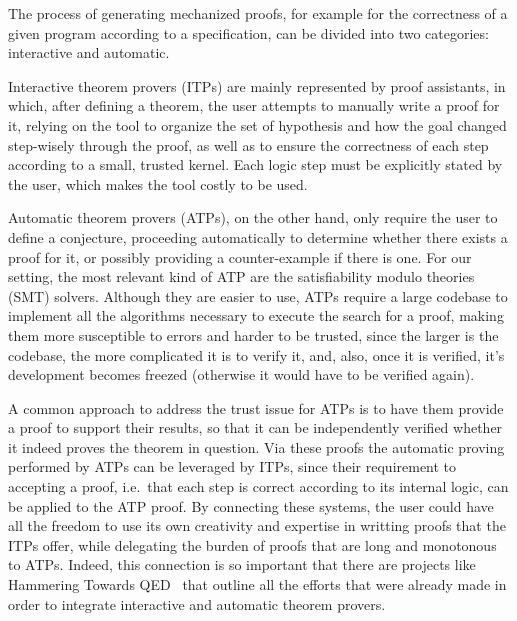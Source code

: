 The process of generating mechanized proofs, for example for the
correctness of a given program according to a specification, can be divided into
two categories: interactive and automatic.

Interactive theorem provers (ITPs) are mainly represented by proof assistants, in which, after defining
a theorem, the user attempts to manually write a proof for it,
relying on the tool to organize the set of hypothesis and
how the goal changed step-wisely through the proof, as well as to ensure the
correctness of each step according to a small, trusted kernel.
%
Each logic step must be explicitly stated by the user, which makes the tool
costly to be used.

Automatic theorem provers (ATPs), on the other hand,
only require the user to define a conjecture, proceeding automatically to
determine whether there exists a proof for it, or possibly providing a
counter-example if there is one.
%
For our setting, the most relevant kind of ATP are the satisfiability
modulo theories (SMT)\cite{Barrett2018} solvers.
%
Although they are easier to use, ATPs require a large
codebase to implement all the algorithms necessary to execute the search for a proof,
making them more susceptible to errors and harder to be trusted, since the
larger is the codebase, the more complicated it is
to verify it, and, also, once it is verified, it's development becomes freezed
(otherwise it would have to be verified again).

A common approach to address the trust issue for ATPs is to have them provide a
proof to support their results, so that it can be independently verified whether
it indeed proves the theorem in question.
%
Via these proofs the automatic proving performed by ATPs can be
leveraged by ITPs, since their requirement to accepting a proof, i.e.\ that each
step is correct according to its internal logic, can be applied to the ATP
proof.
%
By connecting these systems, the user could have all the freedom to use its own
creativity and expertise in writting proofs that the ITPs offer, while delegating
the burden of proofs that are long and monotonous to ATPs. Indeed, this
connection is so important that there are projects like Hammering Towards QED~\cite{hammering}
that outline all the efforts that were already made in order to integrate
interactive and automatic theorem provers.

